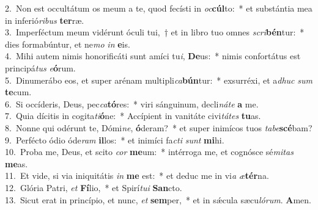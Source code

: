 {2.~}Non est occultátum os meum a te, quod fecísti in \textit{oc}\textbf{cúl}to:~* et substántia mea in inferió\textit{ri}\textit{bus} \textbf{ter}ræ.\\
{3.~}Imperféctum meum vidérunt óculi tui,~† et in libro tuo omnes \textit{scri}\textbf{bén}tur:~* dies formabúntur, et ne\textit{mo} \textit{in} \textbf{e}is.\\
{4.~}Mihi autem nimis honorificáti sunt amíci tu\textit{i}, \textbf{De}us:~* nimis confortátus est principá\textit{tus} \textit{e}\textbf{ó}rum.\\
{5.~}Dinumerábo eos, et super arénam multipli\textit{ca}\textbf{bún}tur:~* exsurréxi, et a\textit{dhuc} \textit{sum} \textbf{te}cum.\\
{6.~}Si occíderis, Deus, pec\textit{ca}\textbf{tó}res:~* viri sánguinum, decli\textit{ná}\textit{te} \textbf{a} me.\\
{7.~}Quia dícitis in cogita\textit{ti}\textbf{ó}ne:~* Accípient in vanitáte civi\textit{tá}\textit{tes} \textbf{tu}as.\\
{8.~}Nonne qui odérunt te, Dómi\textit{ne}, \textbf{ó}deram?~* et super inimícos tuos \textit{ta}\textit{be}\textbf{scé}bam?\\
{9.~}Perfécto ódio óde\textit{ram} \textbf{il}los:~* et inimíci fa\textit{cti} \textit{sunt} \textbf{mi}hi.\\
{10.~}Proba me, Deus, et scito \textit{cor} \textbf{me}um:~* intérroga me, et cognósce sé\textit{mi}\textit{tas} \textbf{me}as.\\
{11.~}Et vide, si via iniquitátis \textit{in} \textbf{me} est:~* et deduc me in vi\textit{a} \textit{æ}\textbf{tér}na.\\
{12.~}Glória Patri, \textit{et} \textbf{Fí}lio,~* et Spirí\textit{tu}\textit{i} \textbf{San}cto.\\
{13.~}Sicut erat in princípio, et nunc, \textit{et} \textbf{sem}per,~* et in sǽcula sæcu\textit{ló}\textit{rum}. \textbf{A}men.\\
